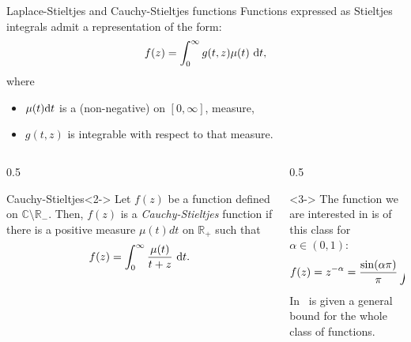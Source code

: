 \documentclass[aspectratio=169,xcolor=dvipsnames]{beamer}
\newcommand{\de}{{\rm d}}
\begin{document}
	\begin{frame}{Laplace-Stieltjes and  Cauchy-Stieltjes functions}
	Functions expressed as Stieltjes integrals
	admit a representation of the form:
	\begin{equation*}
		f(z) = \int_{0}^\infty g(t, z) \mu(t) \ {\de}t, 
	\end{equation*}
	where 
	\begin{itemize}
		\item $\mu(t) {\de}t$ is a (non-negative) on $[0, \infty]$,
		measure,
		\item $g(t, z)$ is integrable 
		with respect to that measure.
	\end{itemize}
	\begin{columns}
	\begin{column}{0.5\columnwidth}
\begin{block}{Cauchy-Stieltjes}<2->
Let $f(z)$ be a function defined on $\mathbb C \setminus \mathbb{R}_-$. 
Then, $f(z)$ is a \emph{Cauchy-Stieltjes} function 
if there is a positive measure $\mu(t)dt$ on
$\mathbb R_+$ 
such that \vspace{-0.5em}
\begin{equation*}
	f(z) =  \int_0^{\infty} \frac{\mu(t)}{t+z}\ {\de}t. 
\end{equation*}
\end{block}
	\end{column}
	\begin{column}{0.5\columnwidth}
	\begin{onlyenv}<3->
	The function we are interested in is of this class for $\alpha \in (0, 1)$:
	\[
	f(z) = z^{-\alpha} = \frac{\sin(\alpha \pi)}{\pi} \int_0^\infty
	\frac{t^{-\alpha}}{t + z}\ {\de}t.
	\]
	In~\parencite{MR4235307} is given a general bound for the whole class of functions.
	\end{onlyenv}
	\end{column}
	\end{columns}
	\end{frame}
\end{document}

